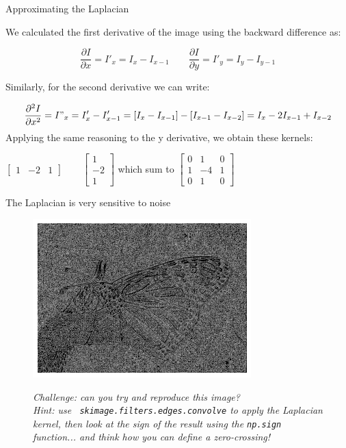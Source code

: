 \documentclass[9pt, aspectratio=169]{beamer}
\begin{document}
\begin{frame}
    {Approximating the Laplacian}

    We calculated the first derivative of the image using the backward difference as:

    \Large
    $$\frac{\partial I}{\partial x} = I'_x = I_x - I_{x-1} \qquad \frac{\partial I}{\partial y} = I'_y = I_y - I_{y-1}$$

    \pause
    \normalsize
    Similarly, for the second derivative we can write:

    \Large
    $$\frac{\partial^2 I}{\partial x^2} = I"_x = I'_x - I'_{x-1} = [I_x - I_{x-1}] - [I_{x-1} - I_{x-2}] = I_x - 2I_{x-1} + I_{x-2}$$
    \pause
    \normalsize
    Applying the same reasoning to the y derivative, we obtain these kernels:

    \centering

    $\begin{bmatrix}
            1 & -2 & 1
        \end{bmatrix}
        \qquad
        \begin{bmatrix}
            1  \\
            -2 \\
            1
        \end{bmatrix}
    $
    which sum to  $\begin{bmatrix}
            0 & 1  & 0 \\
            1 & -4 & 1 \\
            0 & 1  & 0
        \end{bmatrix}$
\end{frame}

\begin{frame}
    {The Laplacian is very sensitive to noise}
    \begin{figure}
        \includegraphics[width=.5\textwidth]{laplacian_zero_crossing_no_smooth.png}
        \caption{\small{\color{gray}{Zero crossing of the Laplacian of our butterfly image}\color{black}}}
        \pause
        \textit{Challenge: can you try and reproduce this image?\\ Hint: use \texttt{ skimage.filters.edges.convolve} to apply the Laplacian kernel, then look at the sign of the result using the \texttt{np.sign} function... and think how you can define a zero-crossing!}
    \end{figure}
\end{frame}
\end{document}
